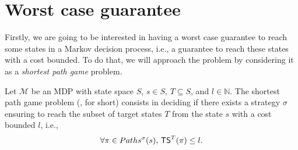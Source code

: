 \section{Worst case guarantee}
Firstly, we are going to be interested in having a worst case guarantee to reach some states in a Markov decision process, i.e., a guarantee to reach these states with a cost bounded.
To do that, we will approach the problem by considering it as a \textit{shortest path game} problem.
\begin{definition}
  Let $\mathcal{M}$ be an MDP with state space $S$, $s \in S$, $T \subseteq S$, and $l \in \mathbb{N}$.
  The shortest path game problem (\SPG{}, for short) consists in deciding if there exists a strategy $\sigma$ ensuring to reach the subset of target states $T$ from the state $s$ with a cost bounded $l$, i.e.,
  \begin{align*}
    \forall \pi \in Paths^\sigma(s), \, \text{\sffamily TS}^T(\pi) \leq l.
  \end{align*}
\end{definition}

